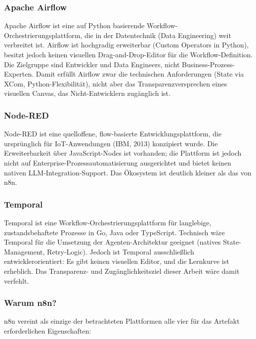\documentclass[12pt,a4paper,oneside]{report}
\begin{document}
\subsubsection{Apache Airflow}

Apache Airflow ist eine auf Python basierende Workflow-Orchestrierungsplattform, die
in der Datentechnik (Data Engineering) weit verbreitet ist. Airflow ist hochgradig
erweiterbar (Custom Operators in Python), besitzt jedoch keinen visuellen
Drag-and-Drop-Editor für die Workflow-Definition. Die Zielgruppe sind Entwickler und
Data Engineers, nicht Business-Prozess-Experten. Damit erfüllt Airflow zwar die
technischen Anforderungen (State via XCom, Python-Flexibilität), nicht aber das
Transparenzversprechen eines visuellen Canvas, das Nicht-Entwicklern zugänglich ist.

\subsubsection{Node-RED}

Node-RED ist eine quelloffene, flow-basierte Entwicklungsplattform, die ursprünglich
für IoT-Anwendungen (IBM, 2013) konzipiert wurde. Die Erweiterbarkeit über JavaScript-Nodes
ist vorhanden; die Plattform ist jedoch nicht auf Enterprise-Prozessautomatisierung
ausgerichtet und bietet keinen nativen \ac{LLM}-Integration-Support. Das Ökosystem ist
deutlich kleiner als das von n8n.

\subsubsection{Temporal}

Temporal ist eine Workflow-Orchestrierungsplattform für langlebige, zustandsbehaftete
Prozesse in Go, Java oder TypeScript. Technisch wäre Temporal für die Umsetzung der
Agenten-Architektur geeignet (natives State-Management, Retry-Logic). Jedoch ist
Temporal ausschließlich entwicklerorientiert: Es gibt keinen visuellen Editor, und die
Lernkurve ist erheblich. Das Transparenz- und Zugänglichkeitsziel dieser Arbeit
wäre damit verfehlt.

\subsubsection{Warum n8n?}

n8n vereint als einzige der betrachteten Plattformen alle vier für das Artefakt
erforderlichen Eigenschaften:
\end{document}
